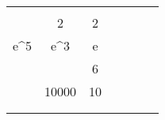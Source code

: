 \begin{problem}
\begin{table}[!htb]
	\centering
	\caption{}
	\label{log:tab:props}
	\begin{tabular}{S[table-format=2.3,parse-numbers=false]S[table-format=5.0,parse-numbers=false]S[table-format=2.0,parse-numbers=false]*{4}{c}}
		\beforeheading
		 &     &    &  &  &  &  \\ 
		             & 2                & 2               &                       &                       &                        &                                              \\\normalline
		e^5           & e^3              & e               &                       &                       &                        &                                              \\            &       & 6               &                       &                       &                        &                                              \\         & 10000            & 10              &                       &                       &                        &                                              \\             &  &  &                       &                       &                        &                                              \\\lastline
	\end{tabular}
\end{table}


\end{problem}
